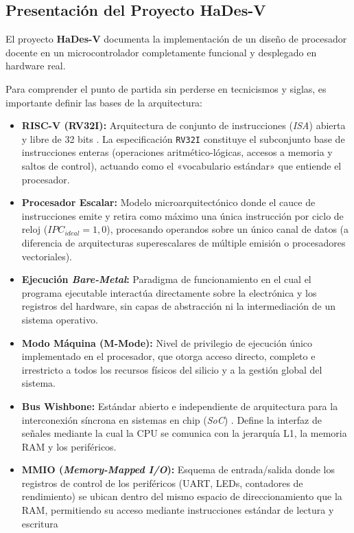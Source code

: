 \documentclass[10pt,a4paper]{article}
\begin{document}
\subsection{Presentación del Proyecto HaDes-V}
El proyecto \textbf{HaDes-V} documenta la implementación de un diseño de procesador docente \cite{scheipel2024} en un microcontrolador completamente funcional 
y desplegado en hardware real. 

Para comprender el punto de partida sin perderse en tecnicismos y siglas, es importante definir las bases de la arquitectura:
\begin{itemize}
    \item \textbf{RISC-V (RV32I):} Arquitectura de conjunto de instrucciones (\textit{ISA}) abierta y libre de 32 bits \cite{riscv_spec}. La especificación 
    \texttt{RV32I} constituye el subconjunto base de instrucciones enteras (operaciones aritmético-lógicas, accesos a memoria y saltos de control), actuando como 
    el «vocabulario estándar» que entiende el procesador.
    \item \textbf{Procesador Escalar:} Modelo microarquitectónico donde el cauce de instrucciones emite y retira como máximo una única instrucción por ciclo 
    de reloj ($IPC_{ideal} = 1,0$), procesando operandos sobre un único canal de datos (a diferencia de arquitecturas superescalares de múltiple emisión o 
    procesadores vectoriales).
    \item \textbf{Ejecución \textit{Bare-Metal}:} Paradigma de funcionamiento en el cual el programa ejecutable interactúa directamente sobre la electrónica y los 
    registros del hardware, sin capas de abstracción ni la intermediación de un sistema operativo.
    \item \textbf{Modo Máquina (M-Mode):} Nivel de privilegio de ejecución único implementado en el procesador, que otorga acceso directo, completo e irrestricto a 
    todos los recursos físicos del silicio y a la gestión global del sistema.
    \item \textbf{Bus Wishbone:} Estándar abierto e independiente de arquitectura para la interconexión síncrona en sistemas en chip (\textit{SoC}) 
    \cite{wishbone_spec}. Define la interfaz de señales mediante la cual la CPU se comunica con la jerarquía L1, la memoria RAM y los periféricos.
    \item \textbf{MMIO (\textit{Memory-Mapped I/O}):} Esquema de entrada/salida donde los registros de control de los periféricos (UART, LEDs, contadores de 
    rendimiento) se ubican dentro del mismo espacio de direccionamiento que la RAM, permitiendo su acceso mediante instrucciones estándar de lectura y escritura 

\end{itemize}
\end{document}
